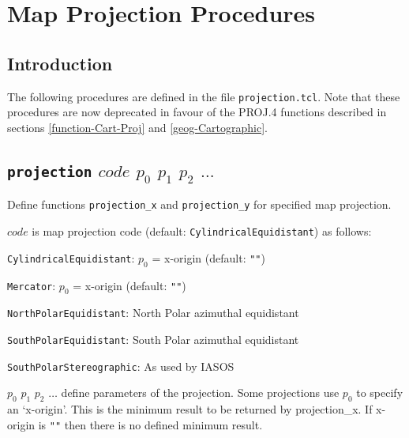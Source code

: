 
\section{Map Projection Procedures}
    \label{projection}

\subsection{Introduction}
    \label{projection-Introduction}

The following procedures are defined in the file 
  \texttt{projection.tcl}.
Note that these procedures are now deprecated in favour of the PROJ.4 functions described in
sections \ref{function-Cart-Proj} and \ref{geog-Cartographic}.

\subsection{\texttt{projection} $\mathit{code}$ $p_0$ $p_1$ $p_2$ $\ldots$}

Define functions 
  \texttt{projection\_x} and 
  \texttt{projection\_y} for specified map projection.
  


  $\mathit{code}$ is map projection code (default: 
  \texttt{CylindricalEquidistant}) as follows:
\begin{bullets}
    \item 
    \texttt{CylindricalEquidistant}: 
    $p_0$ = x-origin (default: 
    \texttt{""})
    \item 
    \texttt{Mercator}: 
    $p_0$ = x-origin (default: 
    \texttt{""})
    \item 
    \texttt{NorthPolarEquidistant}: North Polar azimuthal
    equidistant
    \item 
    \texttt{SouthPolarEquidistant}: South Polar azimuthal
    equidistant
    \item 
    \texttt{SouthPolarStereographic}: As used by IASOS
\end{bullets}

  $p_0$ 
  $p_1$ 
  $p_2$ $\ldots$ define parameters of the projection. Some
  projections use 
  $p_0$ to specify an `x-origin'. This is the minimum
  result to be returned by projection\_x. If x-origin is 
  \texttt{""} then there is no defined minimum
  result.
